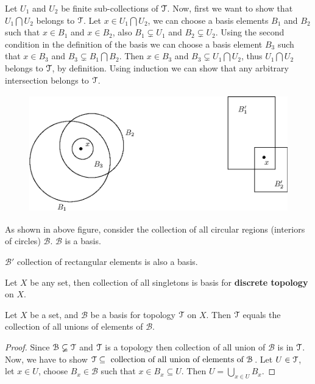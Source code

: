 \documentclass[a4paper,english,12pt]{article}   	%
\begin{document}
 Let $U_1$ and $U_2$  be finite sub-collections of $\mathcal{T}$. Now, first we want to show that $U_1\bigcap U_2 $ belongs to $\mathcal{T}$. Let $x\in U_1\bigcap U_2 $, we can choose a basis elements $B_1$ and $B_2$ such that $x\in B_1$ and $x\in B_2$, also $ B_1\varsubsetneq U_1$ and $B_2\varsubsetneq U_2$. Using the second condition in the definition of the basis we can choose a basis element $B_3$ such that $x\in B_3$ and $B_3\varsubsetneq B_1\bigcap B_2$. Then $x\in B_3$ and $B_3\varsubsetneq U_1\bigcap U_2$, thus $U_1\bigcap U_2$ belongs to $\mathcal{T}$, by definition. Using induction we can show that any arbitrary intersection belongs to $\mathcal{T}$.

\begin{figure}[!h]
 \centering
 \includegraphics[height=2in]{fig134.eps}
\end{figure}

\begin{exmp}
 As shown in above figure, consider the collection of all circular regions (interiors of circles) $\mathcal{B}$. $\mathcal{B}$ is a basis. 
\end{exmp}
\begin{exmp}
 $\mathcal{B}'$ collection of rectangular elements is also a basis. 
\end{exmp}
\begin{exmp}
 Let $X$ be any set, then collection of all singletons is basis for \textbf{discrete topology} on $X$.
\end{exmp}
 \begin{lem}
Let $X$ be a set, and $\mathcal{B}$ be a basis for topology $\mathcal{T}$ on $X$. Then $\mathcal{T}$ equals the collection of all unions of elements of $\mathcal{B}$.
\end{lem}
\begin{proof} Since $\mathcal{B}\varsubsetneq\mathcal{T}$ and $\mathcal{T}$ is a topology then collection of all union of $\mathcal{B}$ is in $\mathcal{T}$. Now, we have to show $\mathcal{T}\subseteq \text{ collection of all union of elements of } \mathcal{B}$. Let $U\in \mathcal{T}$, let $x\in U$, choose $B_x\in \mathcal{B}$ such that $x\in B_x\subseteq U$. Then $U=\bigcup_{x\in U}B_x$.
\end{proof}
\end{document}
